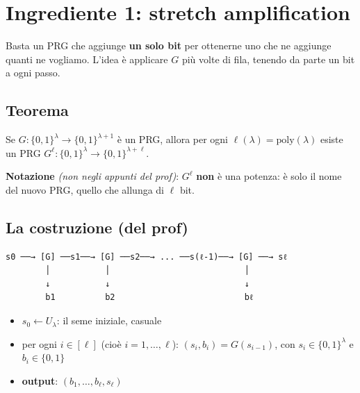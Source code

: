 \section{Ingrediente 1: stretch amplification}

\begin{inbreve}

Basta un PRG che aggiunge \textbf{un solo bit} per ottenerne uno che ne aggiunge quanti ne vogliamo. L'idea è applicare \(G\) più volte di fila, tenendo da parte un bit a ogni passo.

\end{inbreve}

\subsection{Teorema}

Se \(G : \{0,1\}^\lambda \to \{0,1\}^{\lambda+1}\) è un PRG, allora per ogni \(\ell(\lambda) = \text{poly}(\lambda)\) esiste un PRG \(G^\ell : \{0,1\}^\lambda \to \{0,1\}^{\lambda + \ell}\).

\begin{nota}

\textbf{Notazione} \emph{(non negli appunti del prof)}: \(G^\ell\) \textbf{non} è una potenza: è solo il nome del nuovo PRG, quello che allunga di \(\ell\) bit.

\end{nota}

\subsection{La costruzione (del prof)}

\begin{verbatim}
s0 ──→ [G] ──s1──→ [G] ──s2──→ ... ──s(ℓ-1)──→ [G] ──→ sℓ
        │           │                           │
        ↓           ↓                           ↓
        b1          b2                          bℓ
\end{verbatim}

\begin{itemize}
\tightlist
\item
  \(s_0 \leftarrow U_\lambda\): il seme iniziale, casuale
\item
  per ogni \(i \in [\ell]\) (cioè \(i = 1, \dots, \ell\)): \((s_i, b_i) = G(s_{i-1})\), con \(s_i \in \{0,1\}^\lambda\) e \(b_i \in \{0,1\}\)
\item
  \textbf{output}: \((b_1, \dots, b_\ell, s_\ell)\)
\end{itemize}

